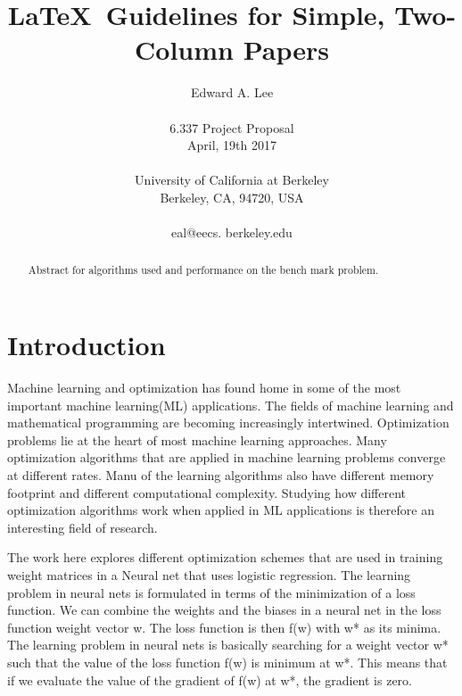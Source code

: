 \documentclass[10pt,twocolumn]{article}
\begin{document}
\title{\LaTeX\ Guidelines for Simple, Two-Column Papers}

\author{Edward A. Lee\\
\\
6.337 Project Proposal\\
April, 19th 2017\\
\\
University of California at Berkeley\\
Berkeley, CA, 94720, USA\\
\\
eal@eecs. berkeley.edu\\
}

\maketitle
\thispagestyle{empty}

\begin{abstract}
   Abstract for algorithms used and performance on the bench mark problem.
\end{abstract}

\section{Introduction}

Machine learning and optimization has found home in some of the most important machine learning(ML) applications. The fields of machine learning and mathematical programming are becoming increasingly intertwined. Optimization problems lie at the heart of most machine learning approaches. Many optimization algorithms that  are applied in machine learning problems converge at different rates. Manu of the learning algorithms also have different memory footprint and different computational complexity. Studying how different optimization algorithms work when applied in ML applications is therefore an interesting field of research.

The work here explores different optimization schemes that are used in training weight matrices in a Neural net that uses logistic regression. The learning problem in neural nets is formulated in terms of the minimization of a loss function. We can combine the weights and the biases in a neural net in the loss function weight vector w. The loss function is then f(w) with w* as its minima. The learning problem in neural nets is basically searching for a weight vector w* such that the value of the loss function f(w) is minimum at w*. This means that if we evaluate the value of the gradient of f(w) at w*, the gradient is zero.
\end{document}
